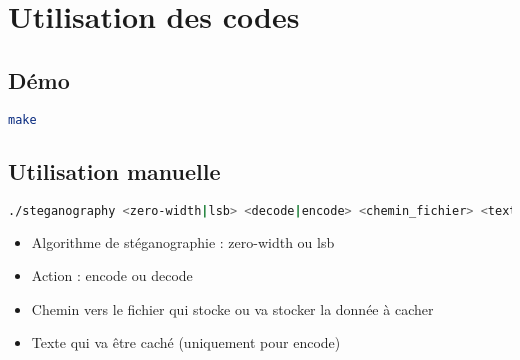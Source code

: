 \newpage
\section{Utilisation des codes}
\subsection{Démo}
\begin{lstlisting}[language=bash,
breaklines]
make
\end{lstlisting}

\subsection{Utilisation manuelle}
\begin{lstlisting}[language=bash,
breaklines]
./steganography <zero-width|lsb> <decode|encode> <chemin_fichier> <texte_optionnel>
\end{lstlisting}
\begin{itemize}
\item Algorithme de stéganographie : zero-width ou lsb
\item Action : encode ou decode
\item Chemin vers le fichier qui stocke ou va stocker la donnée à cacher
\item Texte qui va être caché (uniquement pour encode)
\end{itemize}